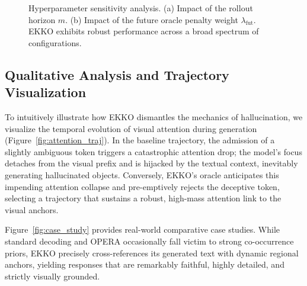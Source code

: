 \begin{table}[t]
\centering
\caption{Ablation study of EKKO's temporal components on LLaVA-1.5.}
\label{tab:ablation}
\end{table}

\begin{figure}[t]
    \centering
    \vspace{3cm}
    \caption{Hyperparameter sensitivity analysis. (a) Impact of the rollout horizon $m$. (b) Impact of the future oracle penalty weight $\lambda_{\mathrm{fut}}$. EKKO exhibits robust performance across a broad spectrum of configurations.}
    \label{fig:ablation_hyper}
\end{figure}

\subsection{Qualitative Analysis and Trajectory Visualization}

To intuitively illustrate how EKKO dismantles the mechanics of hallucination, we visualize the temporal evolution of visual attention during generation (Figure~\ref{fig:attention_traj}). In the baseline trajectory, the admission of a slightly ambiguous token triggers a catastrophic attention drop; the model's focus detaches from the visual prefix and is hijacked by the textual context, inevitably generating hallucinated objects. Conversely, EKKO's oracle anticipates this impending attention collapse and pre-emptively rejects the deceptive token, selecting a trajectory that sustains a robust, high-mass attention link to the visual anchors.

Figure~\ref{fig:case_study} provides real-world comparative case studies. While standard decoding and OPERA occasionally fall victim to strong co-occurrence priors, EKKO precisely cross-references its generated text with dynamic regional anchors, yielding responses that are remarkably faithful, highly detailed, and strictly visually grounded.

